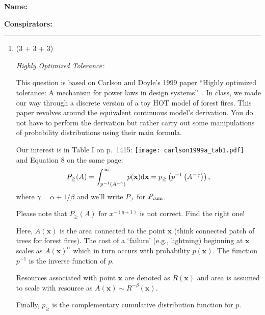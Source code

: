 \textbf{Name:} \\

\medskip

\textbf{Conspirators:} 

\medskip
\medskip

\hrule

\medskip


\assignmentsonly{\pleasesubmitprojectdraft}



\begin{enumerate}

  \item (3 + 3 + 3)

  \textit{Highly Optimized Tolerance:}

  This question is based on Carlson and Doyle's 1999 paper
  ``Highly optimized tolerance: {A} mechanism for power
  laws in design systems''~\cite{carlson1999a}.
  In class, we made our way through a discrete version
  of a toy HOT model of forest fires.
  This paper revolves around the equivalent continuous model's
  derivation.
  You do not have to perform the derivation but rather
  carry out some manipulations of probability distributions
  using their main formula.

  Our interest is in Table I on p.\ 1415:
  \texttt{[image: carlson1999a\_tab1.pdf]}\\
  and Equation 8 on the same page:
  $$
  P_{\ge}(A)
  =
  \int_{p^{-1}(A^{-\gamma})}^{\infty}
  p(\mathbf{x})
  \mbox{d}\mathbf{x}
  =
  p_{\ge}
  \left(
    p^{-1}
    \left(
      A^{-\gamma}
    \right)
  \right),
  $$
  where $\gamma = \alpha + 1/\beta$
  and we'll write $P_{\ge}$ for $P_{\rm cum}$.

  Please note that $P_{\ge}(A)$
  for $x^{-(q+1)}$ is not correct.
  Find the right one!

  Here, $A(\mathbf{x})$ is the area connected 
  to the point $\mathbf{x}$ (think connected patch of trees for forest fires).
  The cost of a `failure' (e.g., lightning) beginning at $\mathbf{x}$
  scales as $A(\mathbf{x})^{\alpha}$
  which in turn occurs with probability 
  $p(\mathbf{x})$.  
  The function $p^{-1}$ is the inverse function of $p$.

  Resources associated with point $\mathbf{x}$ 
  are denoted as $R(\mathbf{x})$ and area is
  assumed to scale with resource as
  $A(\mathbf{x}) \sim R^{-\beta}(\mathbf{x})$.

  Finally, $p_{\ge}$ is the complementary cumulative
  distribution function for $p$.


\end{enumerate}
